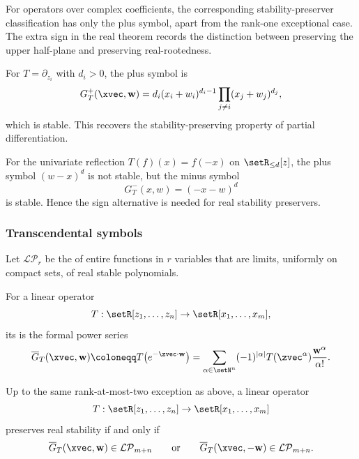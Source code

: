For operators over complex coefficients, the corresponding stability-preserver
classification has only the plus symbol, apart from the rank-one exceptional
case.  The extra sign in the real theorem records the distinction between
preserving the upper half-plane and preserving real-rootedness.

\begin{example*}
For \(T=\partial_{z_i}\) with \(d_i>0\), the plus symbol is
\[
  G_T^{+}(\xvec,\mathbf{w})
  =
  d_i(x_i+w_i)^{d_i-1}
  \prod_{j\neq i}(x_j+w_j)^{d_j},
\]
which is stable.  This recovers the stability-preserving property of
partial differentiation.

For the univariate reflection \(T(f)(x)=f(-x)\) on
\(\setR_{\leq d}[z]\), the plus symbol \((w-x)^d\) is not stable, but the
minus symbol
\[
  G_T^{-}(x,w)=(-x-w)^d
\]
is stable.  Hence the sign alternative is needed for real stability
preservers.
\end{example*}

\subsubsection[transcendentalStabilitySymbols]{Transcendental symbols}

\begin{definition}
Let \(\mathcal{LP}_r\) be the
\label{laguerrePolyaClass}
of entire functions in \(r\) variables
that are limits, uniformly on compact sets, of real stable polynomials.

For a linear operator
\[
  T:\setR[z_1,\dotsc,z_n]\to \setR[x_1,\dotsc,x_m],
\]
its \label{transcendentalSymbol}
is the formal power series
\[
  \overline{G}_T(\xvec,\mathbf{w})
  \coloneqq
  T\!\left(e^{-\zvec\cdot\mathbf{w}}\right)
  =
  \sum_{\alpha\in\setN^n}
    (-1)^{|\alpha|}
    T(\zvec^\alpha)
    \frac{\mathbf{w}^{\alpha}}{\alpha!}.
\]
\end{definition}

\begin{theorem}
\label{borceaBrandenTranscendentalSymbol}
Up to the same rank-at-most-two exception as above, a linear operator
\[
  T:\setR[z_1,\dotsc,z_n]\to \setR[x_1,\dotsc,x_m]
\]
preserves real stability if and only if
\[
  \overline{G}_T(\xvec,\mathbf{w})\in \mathcal{LP}_{m+n}
  \qquad\text{or}\qquad
  \overline{G}_T(\xvec,-\mathbf{w})\in \mathcal{LP}_{m+n}.
\]
\end{theorem}

